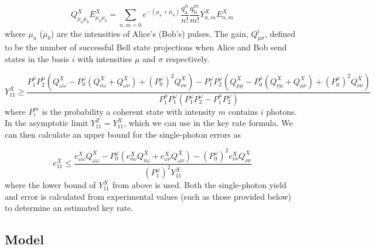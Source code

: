 \begin{equation}
	Q_{\mu_{a} \mu_{b}}^X E^{X}_{\mu_{a} \mu_{b}}=\sum_{n, m=0} e^{-\left(\mu_{\mathrm{a}}+\mu_{\mathrm{b}}\right)} \frac{q_{\mathrm{a}}^{n}}{n !} \frac{q_{\mathrm{b}}^{m}}{m !} Y^{X}_{n, m} E^{X}_{n, m}
\end{equation}
where $\mu_a$ ($\mu_b$) are the intensities of Alice's (Bob's) pulses. The gain, $Q_{\mu\sigma}^i$, defined to be the number of successful Bell state projections when Alice and Bob send states in the basis $i$ with intensities $\mu$ and $\sigma$ respectively.


\begin{equation}
	Y^X_{11} \ge \frac{P^\mu_1 P^\mu_2 (Q_{\omega\omega}^{X} - P^\omega_0 ( Q_{\nu\omega}^X + Q_{\omega\nu}^X) + (P^\omega_0)^2 Q_{\nu\nu}^X) - P^\omega_1 P^\omega_2(Q_{\mu\mu}^{X} - P^\mu_0 ( Q_{\nu\mu}^X + Q_{\mu\nu}^X) + (P^\mu_0)^2 Q_{\nu\nu}^X)}{P^\mu_1 P^\omega_1 ( P^\omega_1  P^\omega_2 - P^\mu_1 P^\omega_2)}
\end{equation}
where $P_i^m$ is the probability a coherent state with intensity $m$ contains $i$ photons. In the asymptotic limit $Y^Z_{11} =  Y^X_{11}$, which we can use in the key rate formula. We can then calculate an upper bound for the single-photon errors as 

\begin{equation}
	e^X_{11} \le \frac{e^X_{\omega\omega}Q^X_{\omega\omega} - P^\omega_0\left(e^X_{\nu\omega}Q^X_{\nu\omega} + e^X_{\omega\nu}Q^X_{\omega\nu}\right) - (P^\omega_0)^2e^X_{\nu\nu}Q^X_{\nu\nu}}{(P^\omega_1)^2 Y^X_{11}}
\end{equation}
where the lower bound of $Y^X_{11}$ from above is used. Both the single-photon yield and error is calculated from experimental values (such as those provided below) to determine an estimated key rate.



\subsection{Model}

